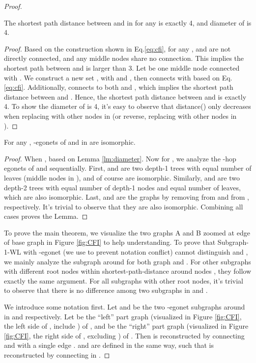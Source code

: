 \begin{proof}
{\begin{lemma}\label{lm:diameter}
The shortest path distance between  and  in  for any  is exactly 4, and diameter of  is 4. 
\end{lemma}
\begin{proof}
Based on the construction shown in Eq.\ref{eq:cfi}, for any ,  and  are not directly connected, and any middle nodes share no connection. This implies the shortest path between  and  is larger than 3. Let  be one middle node connected with . We construct a new set , with  and , then  connects with  based on Eq.\ref{eq:cfi}. Additionally,  connects to both  and , which implies the shortest path distance between  and  . Hence, the shortest path distance between  and  is exactly 4.  To show the diameter of  is 4, it's easy to observe that distance() only decreases when replacing  with other nodes in  (or reverse, replacing  with other nodes in ).
\end{proof}

\begin{lemma}\label{lm:ego}
For any , -egonets of  and  in  are isomorphic.
\end{lemma}
\begin{proof}
When ,  based on Lemma \ref{lm:diameter}. Now for , we analyze the -hop egonets of  and  sequentially. First,  and  are two depth-1 trees with equal number of leaves (middle nodes in ), and of course are isomorphic. Similarly,  and  are two depth-2 trees with equal number of depth-1 nodes and equal number of leaves, which are also isomorphic. Last,  and  are the graphs by removing  from  and  from , respectively. It's trivial to observe that they are also isomorphic. Combining all cases proves the Lemma.
\end{proof}

To prove the main theorem,  we visualize the two graphs A and B zoomed at edge  of base graph in Figure \ref{fig:CFI} to help understanding. To prove that Subgraph-1-WL with -egonet (we use  to prevent notation conflict) cannot distinguish  and , we mainly analyze the subgraph around  for both graph  and . For other subgraphs with different root nodes within  shortest-path-distance around nodes , they follow exactly the same argument. For all subgraphs with other root nodes, it's trivial to observe that there is no difference among two subgraphs in  and . 


We introduce some notation first. Let  and  be the two -egonet subgraphs around  in  and  respectively. Let  be the ``left'' part graph (visualized in Figure \ref{fig:CFI}, the left side of , include ) of , and  be the ``right'' part graph (visualized in Figure \ref{fig:CFI}, the right side of , excluding ) of . Then  is reconstructed by connecting  and  with a single edge .  and  are defined in the same way, such that  is reconstructed by connecting  in . 

}
\end{proof}

